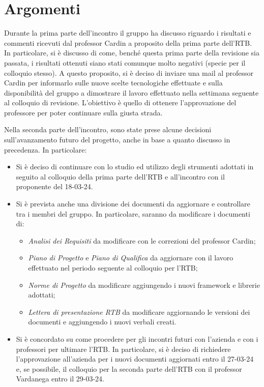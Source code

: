 \section{Argomenti}
Durante la prima parte dell'incontro il gruppo ha discusso riguardo i risultati e commenti ricevuti dal professor Cardin a proposito della prima parte dell'RTB.
In particolare, si è discusso di come, benché questa prima parte della revisione sia passata, i risultati ottenuti siano stati comunque molto negativi (specie per il colloquio stesso).
A questo proposito, si è deciso di inviare una mail al professor Cardin per informarlo sulle nuove scelte tecnologiche effettuate e sulla disponibilità del gruppo a dimostrare il lavoro effettuato nella settimana seguente al colloquio di revisione. L'obiettivo è quello di ottenere l'approvazione del professore per poter continuare sulla giusta strada.
\bigskip

\noindent Nella seconda parte dell'incontro, sono state prese alcune decisioni sull'avanzamento futuro del progetto, anche in base a quanto discusso in precedenza. In particolare:
\begin{itemize}
    \item Si è deciso di continuare con lo studio ed utilizzo degli strumenti adottati in seguito al colloquio della prima parte dell'RTB e all'incontro con il proponente del 18-03-24.
    \item Si è prevista anche una divisione dei documenti da aggiornare e controllare tra i membri del gruppo. In particolare, saranno da modificare i documenti di:
        \begin{itemize}
            \item \textit{Analisi dei Requisiti} da modificare con le correzioni del professor Cardin;
            \item \textit{Piano di Progetto} e \textit{Piano di Qualifica} da aggiornare con il lavoro effettuato nel periodo seguente al colloquio per l'RTB;
            \item \textit{Norme di Progetto} da modificare aggiungendo i nuovi framework e librerie adottati;
            \item \textit{Lettera di presentazione RTB} da modificare aggiornando le versioni dei documenti e aggiungendo i nuovi verbali creati.
        \end{itemize}
    \item Si è concordato su come procedere per gli incontri futuri con l'azienda e con i professori per ultimare l'RTB. In particolare, si è deciso di richiedere l'approvazione all'azienda per i nuovi documenti aggiornati entro il 27-03-24 e, se possibile, il colloquio per la seconda parte dell'RTB con il professor Vardanega entro il 29-03-24.
\end{itemize}